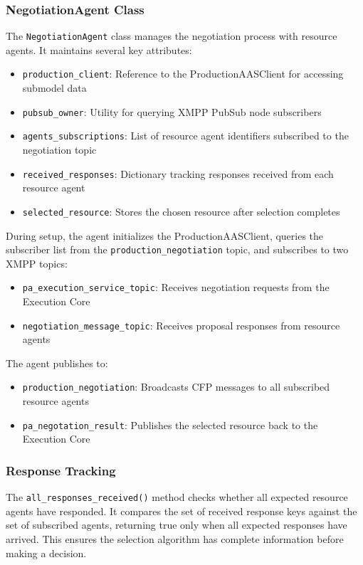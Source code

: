 \subsubsection{NegotiationAgent Class}

The \texttt{NegotiationAgent} class manages the negotiation process with resource agents. It maintains several key attributes:

\begin{itemize}
    \item \texttt{production\_client}: Reference to the ProductionAASClient for accessing submodel data
    \item \texttt{pubsub\_owner}: Utility for querying \ac{XMPP} PubSub node subscribers
    \item \texttt{agents\_subscriptions}: List of resource agent identifiers subscribed to the negotiation topic
    \item \texttt{received\_responses}: Dictionary tracking responses received from each resource agent
    \item \texttt{selected\_resource}: Stores the chosen resource after selection completes
\end{itemize}

During setup, the agent initializes the ProductionAASClient, queries the subscriber list from the \texttt{production\_negotiation} topic, and subscribes to two \ac{XMPP} topics:
\begin{itemize}
    \item \texttt{pa\_execution\_service\_topic}: Receives negotiation requests from the Execution Core
    \item \texttt{negotiation\_message\_topic}: Receives proposal responses from resource agents
\end{itemize}

The agent publishes to:
\begin{itemize}
    \item \texttt{production\_negotiation}: Broadcasts CFP messages to all subscribed resource agents
    \item \texttt{pa\_negotation\_result}: Publishes the selected resource back to the Execution Core
\end{itemize}

\subsubsection{Response Tracking}

The \texttt{all\_responses\_received()} method checks whether all expected resource agents have responded. It compares the set of received response keys against the set of subscribed agents, returning true only when all expected responses have arrived. This ensures the selection algorithm has complete information before making a decision.

